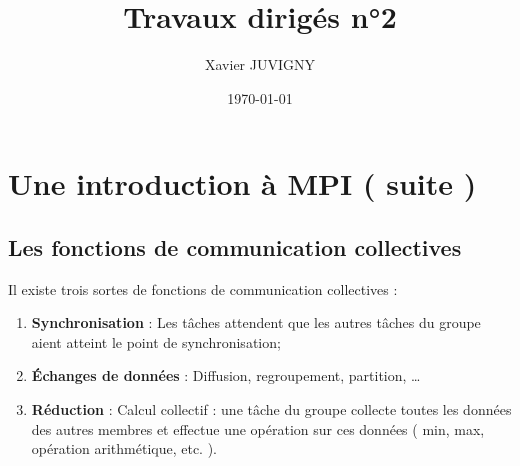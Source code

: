\documentclass[11pt,a4paper]{article}
\author{Xavier JUVIGNY}
\date{\today}
\title{Travaux dirigés n°2}
\begin{document}
\maketitle
\tableofcontents

\section{Une introduction à MPI ( suite )}
\subsection{Les fonctions de communication collectives}

Il existe trois sortes de fonctions de communication collectives :
\begin{enumerate}
\item {\bf Synchronisation} : Les tâches attendent que les autres
tâches du groupe aient atteint le point de synchronisation;
\item {\bf \'Echanges de données} : Diffusion, regroupement, partition, \ldots
\item {\bf Réduction} : Calcul collectif : une tâche du groupe collecte
toutes les données des autres membres et effectue une opération sur
ces données ( min, max, opération arithmétique, etc. ).
\end{enumerate}
\end{document}
